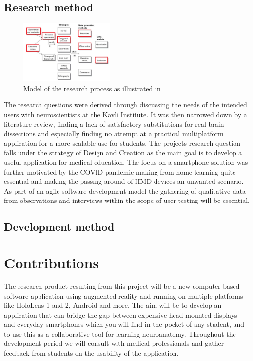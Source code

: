 \subsection*{Research method}

\begin{figure}
    \begin{center}
        \includegraphics[width=0.42\textwidth]{fig/researchplan_image}
    \end{center}
    \caption{Model of the research process as illustrated in \citet{oates2006} }
    \label{researchplan_img}
\end{figure}

The research questions were derived through discussing the needs of the intended users with neuroscientists at the Kavli Institute. It was then narrowed down by a literature review, finding a lack of satisfactory substitutions for real brain dissections and especially finding no attempt at a practical multiplatform application for a more scalable use for students. The projects research question falls under the strategy of Design and Creation as the main goal is to develop a useful application for medical education. The focus on a smartphone solution was further motivated by the COVID-pandemic making from-home learning quite essential and making the passing around of HMD devices an unwanted scenario. As part of an agile software development model the gathering of qualitative data from observations and interviews within the scope of user testing will be essential. 

\subsection*{Development method}

\section{Contributions}

The research product resulting from this project will be a new computer-based software application using augmented reality and running on multiple platforms like HoloLens 1 and 2, Android and more. The aim will be to develop an application that can bridge the gap between expensive head mounted displays and everyday smartphones which you will find in the pocket of any student, and to use this as a collaborative tool for learning neuroanatomy. Throughout the development period we will consult with medical professionals and gather feedback from students on the usability of the application.

